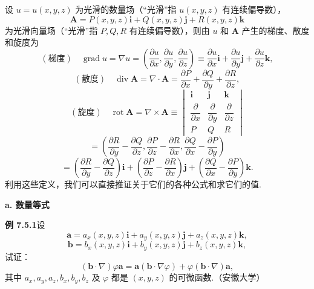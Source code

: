 \documentclass[UTF8,12pt,a4paper,fontset=fandol]{ctexart}
\begin{document}
设 $u=u(x,y,z)$ 为光滑的数量场（“光滑”指 $u(x,y,z)$ 有连续偏导数），
\[
\mathbf A=P(x,y,z)\mathbf i+Q(x,y,z)\mathbf j+R(x,y,z)\mathbf k
\]
为光滑向量场（“光滑”指 $P,Q,R$ 有连续偏导数），则由 $u$ 和 $\mathbf A$ 产生的梯度、散度和旋度为
\[
(\text{梯度})\quad \operatorname{grad}u=\nabla u
=\left(\frac{\partial u}{\partial x},\frac{\partial u}{\partial y},\frac{\partial u}{\partial z}\right)
\equiv\frac{\partial u}{\partial x}\mathbf i+\frac{\partial u}{\partial y}\mathbf j+\frac{\partial u}{\partial z}\mathbf k,
\]
\[
(\text{散度})\quad \operatorname{div}\mathbf A=\nabla\cdot\mathbf A
=\frac{\partial P}{\partial x}+\frac{\partial Q}{\partial y}+\frac{\partial R}{\partial z},
\]
\[
(\text{旋度})\quad \operatorname{rot}\mathbf A=\nabla\times\mathbf A
\equiv
\begin{vmatrix}
\mathbf i & \mathbf j & \mathbf k\\
\dfrac{\partial}{\partial x} & \dfrac{\partial}{\partial y} & \dfrac{\partial}{\partial z}\\
P & Q & R
\end{vmatrix}
\]
\[
=\left(\frac{\partial R}{\partial y}-\frac{\partial Q}{\partial z},\frac{\partial P}{\partial z}-\frac{\partial R}{\partial x},\frac{\partial Q}{\partial x}-\frac{\partial P}{\partial y}\right)
\]
\[
=\left(\frac{\partial R}{\partial y}-\frac{\partial Q}{\partial z}\right)\mathbf i
+\left(\frac{\partial P}{\partial z}-\frac{\partial R}{\partial x}\right)\mathbf j
+\left(\frac{\partial Q}{\partial x}-\frac{\partial P}{\partial y}\right)\mathbf k.
\]
利用这些定义，我们可以直接推证关于它们的各种公式和求它们的值.

\noindent\textbf{a. 数量等式}

\noindent\textbf{例 7.5.1}\quad 设
\[
\mathbf a=a_x(x,y,z)\mathbf i+a_y(x,y,z)\mathbf j+a_z(x,y,z)\mathbf k,
\]
\[
\mathbf b=b_x(x,y,z)\mathbf i+b_y(x,y,z)\mathbf j+b_z(x,y,z)\mathbf k,
\]
试证：
\[
(\mathbf b\cdot\nabla)\varphi\mathbf a=\mathbf a(\mathbf b\cdot\nabla\varphi)+\varphi(\mathbf b\cdot\nabla)\mathbf a,
\]
其中 $a_x,a_y,a_z,b_x,b_y,b_z$ 及 $\varphi$ 都是 $(x,y,z)$ 的可微函数.（安徽大学）
\end{document}

